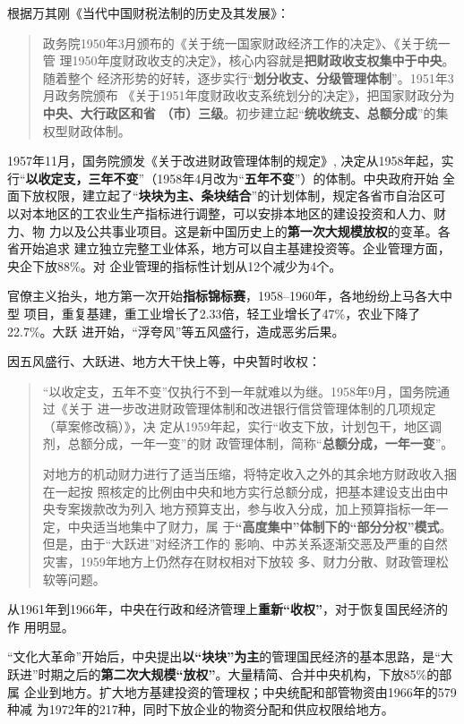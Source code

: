 根据万其刚《当代中国财税法制的历史及其发展》：
\begin{quotation}
  政务院1950年3月颁布的《关于统一国家财政经济工作的决定》、《关于统一管
  理1950年度财政收支的决定》，核心内容就是\textbf{把财政收支权集中于中央}。随着整个
  经济形势的好转，逐步实行“\textbf{划分收支、分级管理体制}”。1951年3月政务院颁布
  《关于1951年度财政收支系统划分的决定》，把国家财政分为\textbf{中央、大行政区和省
    （市）三级}。初步建立起“\textbf{统收统支、总额分成}”的集权型财政体制。
\end{quotation}


1957年11月，国务院颁发《关于改进财政管理体制的规定》, 决定从1958年起，实
行“\textbf{以收定支，三年不变}”（1958年4月改为“\textbf{五年不变}”）的体制。中央政府开始
全面下放权限，建立起了“\textbf{块块为主、条块结合}”的计划体制，规定各省市自治区可
以对本地区的工农业生产指标进行调整，可以安排本地区的建设投资和人力、财力、物
力以及公共事业项目。这是新中国历史上的\textbf{第一次大规模放权}的变革。各省开始追求
建立独立完整工业体系，地方可以自主基建投资等。企业管理方面，央企下放88\%。对
企业管理的指标性计划从12个减少为4个。


官僚主义抬头，地方第一次开始\textbf{指标锦标赛}，1958--1960年，各地纷纷上马各大中型
项目，重复基建，重工业增长了2.33倍，轻工业增长了47\%，农业下降了22.7\%。大跃
进开始，“浮夸风”等五风盛行，造成恶劣后果。

因五风盛行、大跃进、地方大干快上等，中央暂时收权：
\begin{quotation}
  “以收定支，五年不变”仅执行不到一年就难以为继。1958年9月，国务院通过《关于
  进一步改进财政管理体制和改进银行信贷管理体制的几项规定（草案修改稿）》，决
  定从1959年起，实行“收支下放，计划包干，地区调剂，总额分成，一年一变”的财
  政管理体制，简称“\textbf{总额分成，一年一变}”。

  对地方的机动财力进行了适当压缩，将特定收入之外的其余地方财政收入捆在一起按
  照核定的比例由中央和地方实行总额分成，把基本建设支出由中央专案拨款改为列入
  地方预算支出，参与收入分成，加上预算指标一年一定，中央适当地集中了财力，属
  于\textbf{“高度集中”体制下的“部分分权”模式}。但是，由于“大跃进”对经济工作的
  影响、中苏关系逐渐交恶及严重的自然灾害，1959年地方上仍然存在财权相对下放较
  多、财力分散、财政管理松软等问题。\cite{DZSY202204015}
\end{quotation}

从1961年到1966年，中央在行政和经济管理上\textbf{重新“收权”}，对于恢复国民经济的作
用明显。

“文化大革命”开始后，中央提出\textbf{以“块块”为主}的管理国民经济的基本思路，是“大
跃进”时期之后的\textbf{第二次大规模“放权”}。大量精简、合并中央机构，下放85\%的部属
企业到地方。扩大地方基建投资的管理权；中央统配和部管物资由1966年的579种减
为1972年的217种，同时下放企业的物资分配和供应权限给地方。

